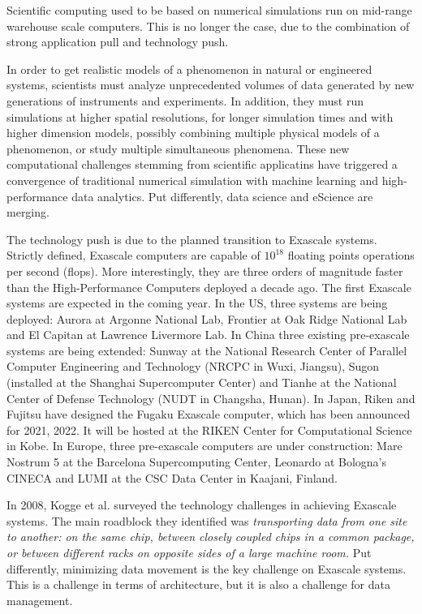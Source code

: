 \documentclass[11pt]{article}
\begin{document}
Scientific computing used to be based on numerical simulations run on mid-range warehouse scale computers.
This is no longer the case, due to the combination of strong application pull and technology push.
 
In order to get realistic models of a phenomenon in natural or engineered systems, scientists 
must analyze unprecedented volumes of data generated by new generations of instruments and experiments.
In addition, they must run simulations at higher spatial resolutions, for longer simulation times and with 
higher dimension models, possibly combining multiple physical models of a phenomenon, or study multiple 
simultaneous phenomena. These new computational challenges stemming from scientific applicatins
 have triggered a convergence of traditional
numerical simulation with machine learning and high-performance data analytics. Put differently,
data science and eScience are merging. 

The technology push is due to the planned transition to Exascale systems.
Strictly defined, Exascale computers are capable of $10^18$ floating points operations per second (flops).
More interestingly, they are three orders of magnitude faster than the High-Performance Computers deployed
a decade ago. 
The first Exascale systems are expected in the coming year. In the US, three systems are
being deployed: Aurora at Argonne National Lab, 
Frontier at Oak Ridge National Lab and El Capitan at Lawrence Livermore Lab. In China 
three existing pre-exascale systems are being extended: Sunway at the National Research Center of Parallel 
Computer Engineering and Technology (NRCPC in Wuxi, Jiangsu), Sugon (installed at the Shanghai Supercomputer
Center)  and Tianhe at the National Center 
of Defense Technology (NUDT in Changsha, Hunan).
In Japan, Riken and Fujitsu have designed the Fugaku Exascale computer, which has been announced for 2021, 2022. It
will be hosted at the RIKEN Center for Computational Science in Kobe.
In Europe, three pre-exascale computers are under construction: Mare Nostrum 5 at the Barcelona Supercomputing Center,
Leonardo at Bologna's CINECA and LUMI at the CSC Data Center in Kaajani, Finland.

In 2008, Kogge et al. surveyed the technology challenges in achieving Exascale systems.
The main roadblock they identified was {\em transporting data from one site to another: on the same chip, 
between closely coupled chips in a common package, or between different racks on opposite sides of a large
machine room.} Put differently, minimizing data movement is the key challenge on Exascale systems.
This is a challenge in terms of architecture, but it is also a challenge for data management.
\end{document}
